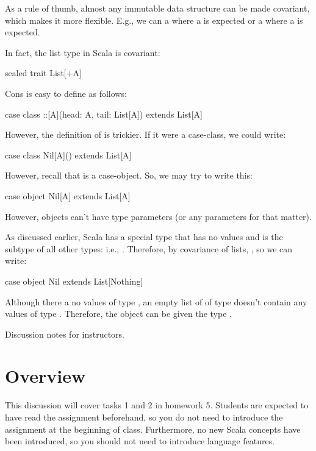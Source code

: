 \documentclass{book}
\begin{document}
As a rule of thumb, almost any immutable data structure can be made
covariant, which makes it more flexible. E.g., we can a 
where a  is expected or a 
where a  is expected.

In fact, the list type in Scala is covariant:
%
\begin{scalacode}
sealed trait List[+A]
\end{scalacode}
Cons is easy to define as follows:
\begin{scalacode}
case class ::[A](head: A, tail: List[A]) extends List[A]
\end{scalacode}
However, the definition of  is trickier. If it were a case-class,
we could write:
\begin{scalacode}
case class Nil[A]() extends List[A]
\end{scalacode}
However, recall that  is a case-object. So, we may try to
write this:
\begin{scalacode}
case object Nil[A] extends List[A]
\end{scalacode}
However, objects can't have type parameters (or any parameters for that matter).

As discussed earlier, Scala has a special type  that has no values
and is the subtype of all other types: i.e.,
. Therefore, by covariance of lists, , so
we can write:
\begin{scalacode}
case object Nil extends List[Nothing]
\end{scalacode}
Although there a no values of type , an empty list of
of type  doesn't contain any values of type .
Therefore, the  object can be given the type .


Discussion notes for instructors.

\section{Overview}

This discussion will cover tasks 1 and 2 in homework 5.  Students are expected to have read the assignment beforehand, so you do not need to introduce the assignment at the beginning of class.  Furthermore, no new Scala concepts have been introduced, so you should not need to introduce language features.
\end{document}
